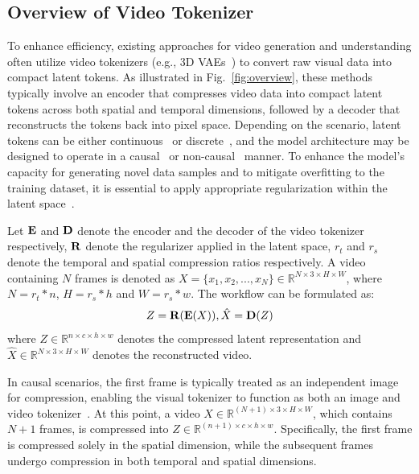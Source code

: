 \documentclass{article} %
\begin{document}
\subsection{Overview of Video Tokenizer}
\label{sec:overview}

To enhance efficiency, existing approaches for video generation and understanding often utilize video tokenizers (e.g., 3D VAEs~\citep{Kingma2014}) to convert raw visual data into compact latent tokens. As illustrated in Fig.~\ref{fig:overview}, these methods typically involve an encoder that compresses video data into compact latent tokens across both spatial and temporal dimensions, followed by a decoder that reconstructs the tokens back into pixel space. Depending on the scenario, latent tokens can be either continuous~\citep{zhao2024cv,yang2024cogvideox,sora} or discrete~\citep{yu2024language,wang2024omnitokenizer,repocosmos}, and the model architecture may be designed to operate in a causal~\citep{yu2024language} or non-causal~\citep{blattmann2023stable} manner. To enhance the model's capacity for generating novel data samples and to mitigate overfitting to the training dataset, it is essential to apply appropriate regularization within the latent space~\citep{Kingma2014,van2017neuralvqvae}.

Let ${\mathbf{E}}$ and ${\mathbf{D}}$ denote the encoder and the decoder of the video tokenizer respectively, ${\mathbf{R}}$ denote the regularizer applied in the latent space, $r_t$ and $r_s$ denote the temporal and spatial compression ratios respectively.
A video containing $N$ frames is denoted as $X = \{x_1, x_2, ..., x_N\} \in \mathbb{R} ^{N \times 3 \times H \times W}$, where $N=r_t*n$, $H=r_s*h$ and $W=r_s*w$. 
The workflow can be formulated as:
\begin{equation}
    \label{equ:1}
        Z = {\mathbf{R}} ( {\mathbf{E}} (X) ), \\ 
        \hat{X} = {\mathbf{D}} (Z)
\end{equation}
where $Z \in \mathbb{R} ^{n \times c \times h \times w}$ denotes the compressed latent representation and $\hat{X} \in \mathbb{R} ^{N \times 3 \times H \times W}$ denotes the reconstructed video.

In causal scenarios, the first frame is typically treated as an independent image for compression, enabling the visual tokenizer to function as both an image and video tokenizer~\citep{yu2024language}. At this point, a video $X \in \mathbb{R} ^{(N+1) \times 3 \times H \times W}$, which contains $N+1$ frames, is compressed into $Z \in \mathbb{R} ^{(n+1) \times c \times h \times w}$. Specifically, the first frame is compressed solely in the spatial dimension, while the subsequent frames undergo compression in both temporal and spatial dimensions.
\end{document}

